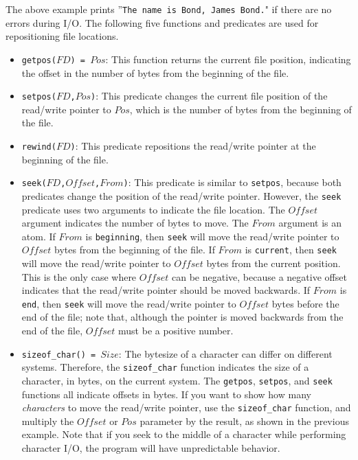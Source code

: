 {The above example prints ''\texttt{The name is Bond, James Bond.}" if there are no errors during I/O.  The following five functions and predicates are used for repositioning file locations.
\begin{itemize}
\item \texttt{getpos($FD$) = $Pos$}: This function returns the current file position, indicating the offset in the number of bytes from the beginning of the file.
\item \texttt{setpos($FD$,$Pos$)}: This predicate changes the current file position of the read/write pointer to $Pos$, which is the number of bytes from the beginning of the file.
\item \texttt{rewind($FD$)}: This predicate repositions the read/write pointer at the beginning of the file.
\item \texttt{seek($FD$,$Offset$,$From$)}: This predicate is similar to \texttt{setpos}, because both predicates change the position of the read/write pointer.  However, the \texttt{seek} predicate uses two arguments to indicate the file location.  The $Offset$ argument indicates the number of bytes to move.  The $From$ argument is an atom.  If $From$ is \texttt{beginning}, then \texttt{seek} will move the read/write pointer to $Offset$ bytes from the beginning of the file.  If $From$ is \texttt{current}, then \texttt{seek} will move the read/write pointer to $Offset$ bytes from the current position.  This is the only case where $Offset$ can be negative, because a negative offset indicates that the read/write pointer should be moved backwards.  If $From$ is \texttt{end}, then \texttt{seek} will move the read/write pointer to $Offset$ bytes before the end of the file; note that, although the pointer is moved backwards from the end of the file, $Offset$ must be a positive number.  
\item \texttt{sizeof\_char() = $Size$}: The bytesize of a character can differ on different systems.  Therefore, the \texttt{sizeof\_char} function indicates the size of a character, in bytes, on the current system.  The \texttt{getpos}, \texttt{setpos}, and \texttt{seek} functions all indicate offsets in bytes.  If you want to show how many \emph{characters} to move the read/write pointer, use the \texttt{sizeof\_char} function, and multiply the $Offset$ or $Pos$ parameter by the result, as shown in the previous example.  Note that if you seek to the middle of a character while performing character I/O, the program will have unpredictable behavior.    

\end{itemize}}
